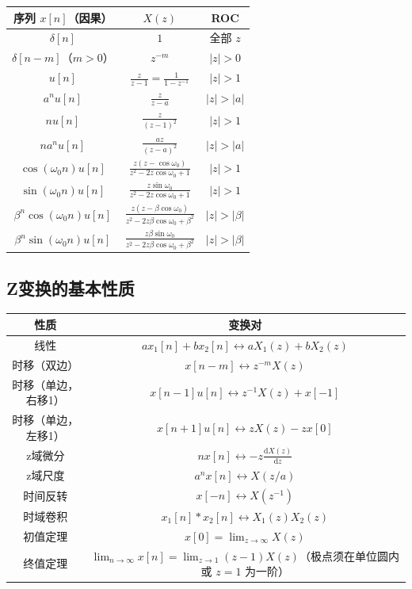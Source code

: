 \documentclass[11pt,a4paper]{ctexart}
\newcommand{\dd}{\mathrm{d}}            %
\newcommand{\dirac}{\delta}             %
\begin{document}
\begin{tabular}{c|c|c}
\toprule
序列 $x[n]$（因果）& $X(z)$ & ROC \\
\midrule
$\dirac[n]$ & $1$ & 全部 $z$ \\
$\dirac[n-m]$（$m>0$）& $z^{-m}$ & $|z| > 0$ \\
$u[n]$ & $\frac{z}{z-1} = \frac{1}{1-z^{-1}}$ & $|z| > 1$ \\
$a^n u[n]$ & $\frac{z}{z-a}$ & $|z| > |a|$ \\
$n u[n]$ & $\frac{z}{(z-1)^2}$ & $|z| > 1$ \\
$n a^n u[n]$ & $\frac{az}{(z-a)^2}$ & $|z| > |a|$ \\
$\cos(\omega_0 n)u[n]$ & $\frac{z(z-\cos\omega_0)}{z^2 - 2z\cos\omega_0 + 1}$ & $|z| > 1$ \\
$\sin(\omega_0 n)u[n]$ & $\frac{z\sin\omega_0}{z^2 - 2z\cos\omega_0 + 1}$ & $|z| > 1$ \\
$\beta^n\cos(\omega_0 n)u[n]$ & $\frac{z(z-\beta\cos\omega_0)}{z^2 - 2z\beta\cos\omega_0 + \beta^2}$ & $|z| > |\beta|$ \\
$\beta^n\sin(\omega_0 n)u[n]$ & $\frac{z\beta\sin\omega_0}{z^2 - 2z\beta\cos\omega_0 + \beta^2}$ & $|z| > |\beta|$ \\
\bottomrule
\end{tabular}

\subsection{Z变换的基本性质}

\begin{longtable}{c|c}
\toprule
性质 & 变换对 \\
\midrule
线性 & $a x_1[n] + b x_2[n] \leftrightarrow a X_1(z) + b X_2(z)$ \\
\midrule
时移（双边） & $x[n-m] \leftrightarrow z^{-m}X(z)$ \\
\midrule
时移（单边，右移1）& $x[n-1]u[n] \leftrightarrow z^{-1}X(z) + x[-1]$ \\
时移（单边，左移1）& $x[n+1]u[n] \leftrightarrow zX(z) - zx[0]$ \\
\midrule
z域微分 & $n x[n] \leftrightarrow -z\frac{\dd X(z)}{\dd z}$ \\
\midrule
z域尺度 & $a^n x[n] \leftrightarrow X(z/a)$ \\
\midrule
时间反转 & $x[-n] \leftrightarrow X(z^{-1})$ \\
\midrule
时域卷积 & $x_1[n] * x_2[n] \leftrightarrow X_1(z)X_2(z)$ \\
\midrule
初值定理 & $x[0] = \lim_{z\to\infty} X(z)$ \\
\midrule
终值定理 & $\lim_{n\to\infty} x[n] = \lim_{z\to 1}(z-1)X(z)$（极点须在单位圆内或 $z=1$ 为一阶） \\
\bottomrule
\end{longtable}
\end{document}
